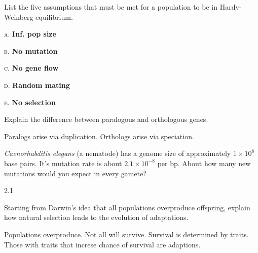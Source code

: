 \documentclass[12pt, addpoints]{exam}
\newcommand*\AnswerBox[2]{%
    \parbox[t][#1]{0.92\textwidth}{%
    \begin{solution}#2\end{solution}}
    \vspace{\stretch{1}}
}
\begin{document}
\begin{questions}
\question[10]
List the five assumptions that must be met for a population to be in Hardy-Weinberg equilibrium.

\textsc{a.} \ifprintanswers \textbf{Inf. pop size}\fi \vspace{\baselineskip}

\textsc{b.} \ifprintanswers \textbf{No mutation}\fi \vspace{\baselineskip}

\textsc{c.} \ifprintanswers \textbf{No gene flow}\fi \vspace{\baselineskip}

\textsc{d.} \ifprintanswers \textbf{Random mating}\fi \vspace{\baselineskip}

\textsc{e.} \ifprintanswers \textbf{No selection}\fi \vspace{\baselineskip}

\question[5]
Explain the difference between paralogous and orthologous genes.

\AnswerBox{0.1\textheight}{Paralogs arise via duplication. Orthologs arise via speciation.}

\question[5]
\textit{Caenorhabditis elegans} (a nematode) has a genome size of approximately $1 \times 10^8$ base pairs. It's mutation rate is about $2.1 \times 10^{-8}$ per bp. About how many new mutations would you expect in every gamete?

\AnswerBox{0.1\textheight}{2.1}

%

\question[8]
Starting from Darwin's idea that all populations overproduce offspring, explain how natural selection leads to the evolution of adaptations.

\AnswerBox{0.2\textheight}{Populations overproduce. Not all will survive. Survival is determined by traits. Those with traits that increse chance of survival are adaptions.}


%


\end{questions}
\end{document}
